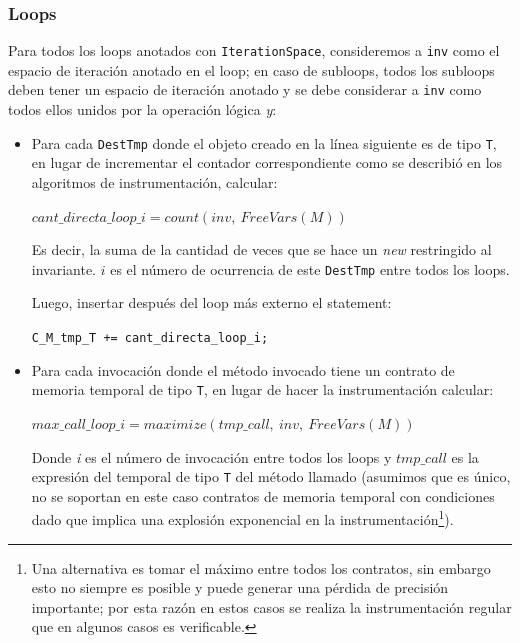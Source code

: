 \documentclass[12pt,a4paper]{article}
\newcommand\mono[1]{\texttt{#1}}
\begin{document}
			\subsubsection{Loops} \label{sec:loopsbarv}
				Para todos los loops anotados con \mono{IterationSpace}, consideremos a \mono{inv} como el espacio de iteración anotado en el loop; en caso de subloops, todos los subloops deben tener un espacio de iteración anotado y se debe considerar a \mono{inv} como todos ellos unidos por la operación lógica \textit{y}:
				\begin{itemize}
					\item
						Para cada \mono{DestTmp} donde el objeto creado en la línea siguiente es de tipo \mono{T}, en lugar de incrementar el contador correspondiente como se describió en los algoritmos de instrumentación, calcular:

						\begin{center}
						$cant\_directa\_loop\_i = count(inv,\ \mathit{FreeVars}(M))$
						\end{center}

						Es decir, la suma de la cantidad de veces que se hace un \textit{new} restringido al invariante. $i$ es el número de ocurrencia de este \mono{DestTmp} entre todos los loops.

						Luego, insertar después del loop más externo el statement:

						\begin{center}
						\mono{C\_M\_tmp\_T += cant\_directa\_loop\_i;}
						\end{center}
					\item
						Para cada invocación donde el método invocado tiene un contrato de memoria temporal de tipo \mono{T}, en lugar de hacer la instrumentación calcular:

						\begin{center}
						$max\_call\_loop\_i = maximize(tmp\_call,\ inv,\ \mathit{FreeVars}(M))$
						\end{center}

						Donde \textit{i} es el número de invocación entre todos los loops y $tmp\_call$ es la expresión del temporal de tipo \mono{T} del método llamado (asumimos que es único, no se soportan en este caso contratos de memoria temporal con condiciones dado que implica una explosión exponencial en la instrumentación\footnote{Una alternativa es tomar el máximo entre todos los contratos, sin embargo esto no siempre es posible y puede generar una pérdida de precisión importante; por esta razón en estos casos se realiza la instrumentación regular que en algunos casos es verificable.}).


\end{itemize}
\end{document}
